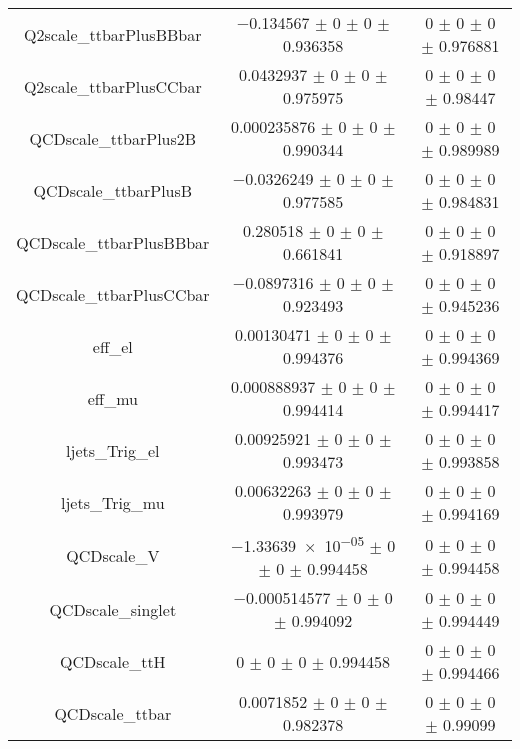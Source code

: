 \begin{table}
\begin{tabular}{ccc}
Q2scale\_ttbarPlusBBbar & \num{-0.134567} $\pm$ \num{0} $\pm$ \num{0} $\pm$ \num{0.936358} & \num{0} $\pm$ \num{0} $\pm$ \num{0} $\pm$ \num{0.976881}\\
Q2scale\_ttbarPlusCCbar & \num{0.0432937} $\pm$ \num{0} $\pm$ \num{0} $\pm$ \num{0.975975} & \num{0} $\pm$ \num{0} $\pm$ \num{0} $\pm$ \num{0.98447}\\
QCDscale\_ttbarPlus2B & \num{0.000235876} $\pm$ \num{0} $\pm$ \num{0} $\pm$ \num{0.990344} & \num{0} $\pm$ \num{0} $\pm$ \num{0} $\pm$ \num{0.989989}\\
QCDscale\_ttbarPlusB & \num{-0.0326249} $\pm$ \num{0} $\pm$ \num{0} $\pm$ \num{0.977585} & \num{0} $\pm$ \num{0} $\pm$ \num{0} $\pm$ \num{0.984831}\\
QCDscale\_ttbarPlusBBbar & \num{0.280518} $\pm$ \num{0} $\pm$ \num{0} $\pm$ \num{0.661841} & \num{0} $\pm$ \num{0} $\pm$ \num{0} $\pm$ \num{0.918897}\\
QCDscale\_ttbarPlusCCbar & \num{-0.0897316} $\pm$ \num{0} $\pm$ \num{0} $\pm$ \num{0.923493} & \num{0} $\pm$ \num{0} $\pm$ \num{0} $\pm$ \num{0.945236}\\
eff\_el & \num{0.00130471} $\pm$ \num{0} $\pm$ \num{0} $\pm$ \num{0.994376} & \num{0} $\pm$ \num{0} $\pm$ \num{0} $\pm$ \num{0.994369}\\
eff\_mu & \num{0.000888937} $\pm$ \num{0} $\pm$ \num{0} $\pm$ \num{0.994414} & \num{0} $\pm$ \num{0} $\pm$ \num{0} $\pm$ \num{0.994417}\\
ljets\_Trig\_el & \num{0.00925921} $\pm$ \num{0} $\pm$ \num{0} $\pm$ \num{0.993473} & \num{0} $\pm$ \num{0} $\pm$ \num{0} $\pm$ \num{0.993858}\\
ljets\_Trig\_mu & \num{0.00632263} $\pm$ \num{0} $\pm$ \num{0} $\pm$ \num{0.993979} & \num{0} $\pm$ \num{0} $\pm$ \num{0} $\pm$ \num{0.994169}\\
QCDscale\_V & \num{-1.33639e-05} $\pm$ \num{0} $\pm$ \num{0} $\pm$ \num{0.994458} & \num{0} $\pm$ \num{0} $\pm$ \num{0} $\pm$ \num{0.994458}\\
QCDscale\_singlet & \num{-0.000514577} $\pm$ \num{0} $\pm$ \num{0} $\pm$ \num{0.994092} & \num{0} $\pm$ \num{0} $\pm$ \num{0} $\pm$ \num{0.994449}\\
QCDscale\_ttH & \num{0} $\pm$ \num{0} $\pm$ \num{0} $\pm$ \num{0.994458} & \num{0} $\pm$ \num{0} $\pm$ \num{0} $\pm$ \num{0.994466}\\
QCDscale\_ttbar & \num{0.0071852} $\pm$ \num{0} $\pm$ \num{0} $\pm$ \num{0.982378} & \num{0} $\pm$ \num{0} $\pm$ \num{0} $\pm$ \num{0.99099}\\

\end{tabular}
\end{table}
